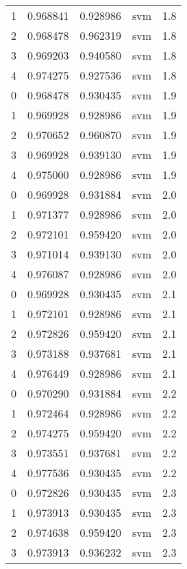 \begin{tabular}{rrrlr}
     1 & 0.968841 & 0.928986 &      svm &        1.8 \\
     2 & 0.968478 & 0.962319 &      svm &        1.8 \\
     3 & 0.969203 & 0.940580 &      svm &        1.8 \\
     4 & 0.974275 & 0.927536 &      svm &        1.8 \\
     0 & 0.968478 & 0.930435 &      svm &        1.9 \\
     1 & 0.969928 & 0.928986 &      svm &        1.9 \\
     2 & 0.970652 & 0.960870 &      svm &        1.9 \\
     3 & 0.969928 & 0.939130 &      svm &        1.9 \\
     4 & 0.975000 & 0.928986 &      svm &        1.9 \\
     0 & 0.969928 & 0.931884 &      svm &        2.0 \\
     1 & 0.971377 & 0.928986 &      svm &        2.0 \\
     2 & 0.972101 & 0.959420 &      svm &        2.0 \\
     3 & 0.971014 & 0.939130 &      svm &        2.0 \\
     4 & 0.976087 & 0.928986 &      svm &        2.0 \\
     0 & 0.969928 & 0.930435 &      svm &        2.1 \\
     1 & 0.972101 & 0.928986 &      svm &        2.1 \\
     2 & 0.972826 & 0.959420 &      svm &        2.1 \\
     3 & 0.973188 & 0.937681 &      svm &        2.1 \\
     4 & 0.976449 & 0.928986 &      svm &        2.1 \\
     0 & 0.970290 & 0.931884 &      svm &        2.2 \\
     1 & 0.972464 & 0.928986 &      svm &        2.2 \\
     2 & 0.974275 & 0.959420 &      svm &        2.2 \\
     3 & 0.973551 & 0.937681 &      svm &        2.2 \\
     4 & 0.977536 & 0.930435 &      svm &        2.2 \\
     0 & 0.972826 & 0.930435 &      svm &        2.3 \\
     1 & 0.973913 & 0.930435 &      svm &        2.3 \\
     2 & 0.974638 & 0.959420 &      svm &        2.3 \\
     3 & 0.973913 & 0.936232 &      svm &        2.3 \\

\end{tabular}
